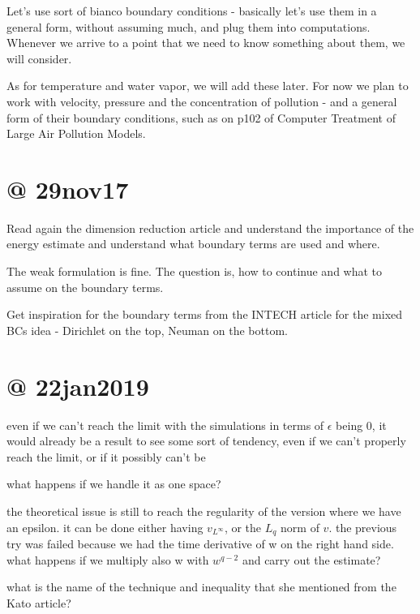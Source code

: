 \documentclass{article}
\begin{document}
Let's use sort of bianco boundary conditions - basically let's use them in a general form, without assuming much, and plug them into computations. Whenever we arrive to a point that we need to know something about them, we will consider.

As for temperature and water vapor, we will add these later. For now we plan to work with velocity, pressure and the concentration of pollution - and a general form of their boundary conditions, such as on p102 of Computer Treatment of Large Air Pollution Models.

\section{@ 29nov17}

Read again the dimension reduction article and understand the importance of the energy estimate and understand what boundary terms are used and where.

The weak formulation is fine. The question is, how to continue and what to assume on the boundary terms.

Get inspiration for the boundary terms from the INTECH article for the mixed BCs idea - Dirichlet on the top, Neuman on the bottom.

\section{@ 22jan2019}

even if we can't reach the limit with the simulations in terms of $\epsilon$ being 0, it would already be a result to see some sort of tendency, even if we can't properly reach the limit, or if it possibly can't be

what happens if we handle it as one space?

the theoretical issue is still to reach the regularity of the version where we have an epsilon. it can be done either having $v_{L^\infty}$, or the $L_q$ norm of $v$. the previous try was failed because we had the time derivative of w on the right hand side. what happens if we multiply also w with $w^{q-2}$ and carry out the estimate?

what is the name of the technique and inequality that she mentioned from the Kato article?
\end{document}
